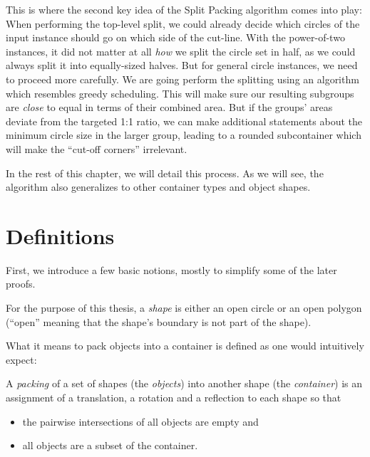 \documentclass[a4paper,style=print,bibliography=totoc,nexus,lnum,extramargin]{tubsbook}
\begin{document}
This is where the second key idea of the Split Packing algorithm comes into play:
When performing the top-level split, we could already decide which circles of the input instance should go on which side of the cut-line. With the power-of-two instances, it did not matter at all \emph{how} we split the circle set in half, as we could always split it into equally-sized halves.
But for general circle instances, we need to proceed more carefully. We are going perform the splitting using an algorithm which resembles greedy scheduling. This will make sure our resulting subgroups are \emph{close} to equal in terms of their combined area. But if the groups' areas deviate from the targeted 1:1 ratio, we can make additional statements about the minimum circle size in the larger group, leading to a rounded subcontainer which will make the “cut-off corners” irrelevant.

In the rest of this chapter, we will detail this process. As we will see, the algorithm also generalizes to other container types and object shapes.

\section{Definitions}

First, we introduce a few basic notions, mostly to simplify some of the later proofs.

\begin{definition}
    For the purpose of this thesis, a \emph{shape} is either an open circle or an open polygon (“open” meaning that the shape's boundary is not part of the shape).
\end{definition}

What it means to pack objects into a container is defined as one would intuitively expect:

\begin{definition}
    A \emph{packing} of a set of shapes (the \emph{objects}) into another shape (the \emph{container}) is an assignment of a translation, a rotation and a reflection to each shape so that

    \begin{itemize}
        \item the pairwise intersections of all objects are empty and
        \item all objects are a subset of the container.
    \end{itemize}
\end{definition}
\end{document}
